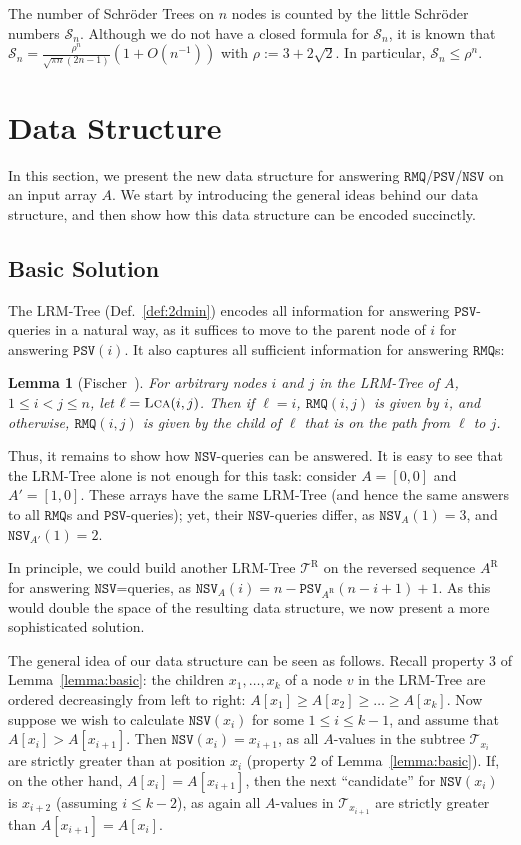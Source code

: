 \documentclass[11pt,onecolumn,final]{article} \usepackage{a4}
\newcommand{\supcat}{\mathcal{S}}
\newcommand{\psv}[0]{\mathtt{PSV}}
\newcommand{\nsv}[0]{\mathtt{NSV}}
\newcommand{\rmq}[0]{\mathtt{RMQ}}
\newcommand{\lca}{\ensuremath{\textsc{Lca}}}
\theoremstyle{plain}
\newtheorem{lemma}[definition]{Lemma}
\theoremstyle{remark}
\begin{document}
The number of Schr\"oder Trees on $n$ nodes is counted by the little Schr\"oder numbers $\supcat_n$. Although we do not have a closed formula for $\supcat_n$, it is known \cite{merlini04waiting} that $\supcat_n=\frac{\rho^n}{\sqrt{\pi n}(2n-1)} (1+O(n^{-1}))$ with $\rho:=3+2\sqrt{2}$. In particular, $\supcat_n \le \rho^n$.

\section{Data Structure}
\label{sect:main}
In this section, we present the new data structure for answering $\rmq$/$\psv$/$\nsv$ on an input array $A$. We start by introducing the general ideas behind our data structure, and then show how this data structure can be encoded succinctly.

\subsection{Basic Solution}
\label{sect:basic}
The LRM-Tree (Def.~\ref{def:2dmin}) encodes all information for answering $\psv$-queries in a natural way, as it suffices to move to the parent node of $i$ for answering $\psv(i)$. It also captures all sufficient information for answering $\rmq$s:

\begin{lemma}[Fischer~\cite{fischer10optimal}]
  \label{lemma:rmqlca}
  For arbitrary nodes $i$ and $j$ in the LRM-Tree of $A$, $1 \le i < j \le n$, let $\ell=\lca(i,j)$. Then if $\ell=i$, $\rmq(i,j)$ is given by $i$, and otherwise, $\rmq(i,j)$ is given by the child of $\ell$ that is on the path from $\ell$ to $j$.
\end{lemma}

Thus, it remains to show how $\nsv$-queries can be answered. It is easy to see that the LRM-Tree alone is not enough for this task: consider $A=[0,0]$ and $A'=[1,0]$. These arrays have the same LRM-Tree (and hence the same answers to all $\rmq$s and $\psv$-queries); yet, their $\nsv$-queries differ, as $\nsv_A(1)=3$, and $\nsv_{A'}(1)=2$.

In principle, we could build another LRM-Tree $\mathcal{T}^\textrm{R}$ on the reversed sequence $A^\textrm{R}$ for answering $\nsv$=queries, as $\nsv_A(i)=n-\psv_{A^\textrm{R}}(n-i+1)+1$. As this would double the space of the resulting data structure, we now present a more sophisticated solution.

The general idea of our data structure can be seen as follows. Recall property 3 of Lemma~\ref{lemma:basic}: the children $x_1,\dots,x_k$ of a node $v$ in the LRM-Tree are ordered decreasingly from left to right: $A[x_1] \ge A[x_2] \ge \dots \ge A[x_k]$. Now suppose we wish to calculate $\nsv(x_i)$ for some $1\le i \le k-1$, and assume that $A[x_i] > A[x_{i+1}]$. Then $\nsv(x_i)=x_{i+1}$, as all $A$-values in the subtree $\mathcal{T}_{x_i}$ are strictly greater than at position $x_i$ (property 2 of Lemma~\ref{lemma:basic}). If, on the other hand, $A[x_i] = A[x_{i+1}]$, then the next ``candidate'' for $\nsv(x_i)$ is $x_{i+2}$ (assuming $i\le k-2$), as again all $A$-values in $\mathcal{T}_{x_{i+1}}$ are strictly greater than $A[x_{i+1}]=A[x_i]$.
\end{document}
